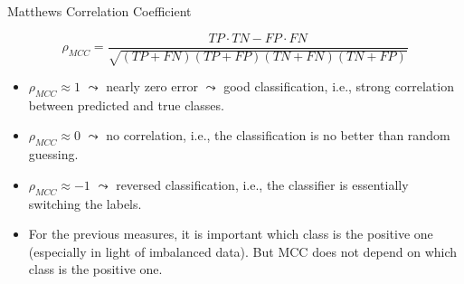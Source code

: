 \documentclass[11pt,compress,t,notes=noshow, xcolor=table]{beamer}
\begin{document}
\begin{vbframe}{Matthews Correlation Coefficient}
    \footnotesize{
        $$   \rho_{MCC} = \frac{TP\cdot TN - FP \cdot FN}{\sqrt{(TP+FN)(TP+FP)(TN+FN)(TN+FP)}}$$

        \begin{itemize}
            \item $\rho_{MCC} \approx 1$ $\leadsto$ nearly zero error $\leadsto$ good classification, i.e., strong correlation between predicted and true classes.
            \vspace{10pt}
    	
            \item $\rho_{MCC} \approx 0$ $\leadsto$ no correlation, i.e., the classification is no better than random guessing.
            \vspace{10pt}
    	
            \item $\rho_{MCC} \approx -1$ $\leadsto$ reversed classification, i.e., the classifier is essentially switching the labels.
            \vspace{10pt}
    
            \item For the previous measures, it is important which class is the positive one (especially in light of imbalanced data). But MCC does not depend on which class is the positive one.
            
        \end{itemize}
         
    }
    
\end{vbframe}
\end{document}
